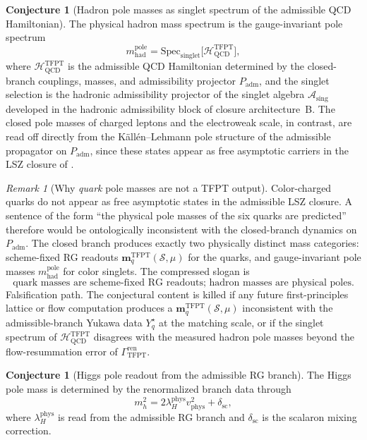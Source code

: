 \documentclass[11pt,a4paper]{article}
\theoremstyle{definition}
\newtheorem{conjecture}[theorem]{Conjecture}
\theoremstyle{remark}
\newtheorem*{remark}{Remark}
\newcommand{\Asing}{\mathcal A_{\mathrm{sing}}}
\newcommand{\Padm}{P_{\mathrm{adm}}}
\begin{document}
\begin{conjecture}[Hadron pole masses as singlet spectrum of the admissible QCD Hamiltonian]
\label{thm:hadron_pole_masses_singlet_spectrum}
The physical hadron mass spectrum is the gauge-invariant pole spectrum
\[
m_{\mathrm{had}}^{\mathrm{pole}}
=
\mathrm{Spec}_{\mathrm{singlet}}
\bigl[\mathcal H_{\mathrm{QCD}}^{\mathrm{TFPT}}\bigr],
\]
where $\mathcal H_{\mathrm{QCD}}^{\mathrm{TFPT}}$ is the admissible QCD Hamiltonian determined by the
closed-branch couplings, masses, and admissibility projector $\Padm$, and the singlet selection is
the hadronic admissibility projector of the singlet algebra $\Asing$ developed in the hadronic
admissibility block of closure architecture~B. The closed pole
masses of charged leptons and the electroweak scale, in contrast, are read off directly from the
Källén--Lehmann pole structure of the admissible propagator on $\Padm$, since these states appear as
free asymptotic carriers in the LSZ closure of .
\end{conjecture}

\begin{remark}[Why \emph{quark} pole masses are not a TFPT output]
Color-charged quarks do not appear as free asymptotic states in the admissible LSZ closure. A
sentence of the form ``the physical pole masses of the six quarks are predicted'' therefore would be
ontologically inconsistent with the closed-branch dynamics on $\Padm$. The closed branch produces
exactly two physically distinct mass categories: scheme-fixed RG readouts
$\mathbf m_q^{\mathrm{TFPT}}(\mathcal S,\mu)$ for the quarks, and gauge-invariant pole masses
$m_{\mathrm{had}}^{\mathrm{pole}}$ for color singlets. The compressed slogan is
\[
\boxed{\text{quark masses are scheme-fixed RG readouts; hadron masses are physical poles.}}
\]
Falsification path. The conjectural content is killed if any future first-principles lattice or
flow computation produces a $\mathbf m_q^{\mathrm{TFPT}}(\mathcal S,\mu)$ inconsistent with the
admissible-branch Yukawa data $Y_q^\star$ at the matching scale, or if the singlet spectrum of
$\mathcal H_{\mathrm{QCD}}^{\mathrm{TFPT}}$ disagrees with the measured hadron pole masses beyond the
flow-resummation error of $\Gamma_{\mathrm{TFPT}}^{\mathrm{ren}}$.
\end{remark}

\begin{conjecture}[Higgs pole readout from the admissible RG branch]
\label{thm:higgs_pole_readout_rg_branch}
The Higgs pole mass is determined by the renormalized branch data through
\[
m_h^2=2\lambda_H^{\mathrm{phys}}v_{\mathrm{phys}}^2+\delta_{\mathrm{sc}},
\]
where \(\lambda_H^{\mathrm{phys}}\) is read from the admissible RG branch and
\(\delta_{\mathrm{sc}}\) is the scalaron mixing correction.
\end{conjecture}
\end{document}
